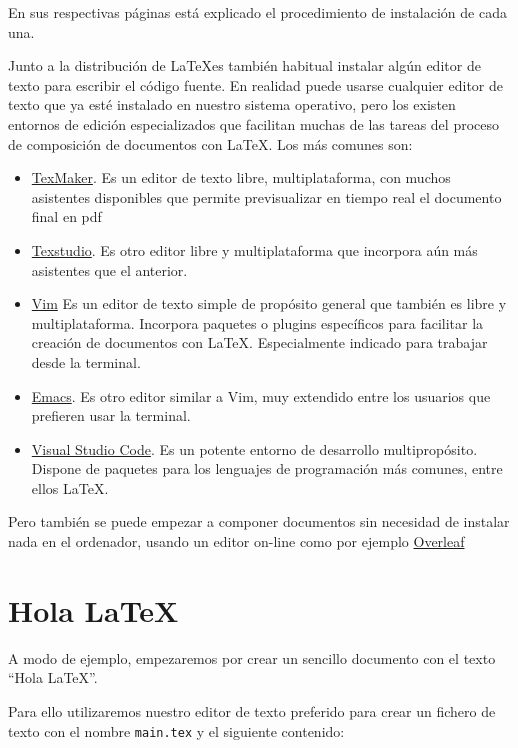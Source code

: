 \documentclass[
  letterpaper,
  DIV=11,
  numbers=noendperiod]{scrreport}
\providecommand{\tightlist}{%
  \setlength{\itemsep}{0pt}\setlength{\parskip}{0pt}}\usepackage{longtable,booktabs,array}
\begin{document}
En sus respectivas páginas está explicado el procedimiento de
instalación de cada una.

Junto a la distribución de \LaTeX es también habitual instalar algún
editor de texto para escribir el código fuente. En realidad puede usarse
cualquier editor de texto que ya esté instalado en nuestro sistema
operativo, pero los existen entornos de edición especializados que
facilitan muchas de las tareas del proceso de composición de documentos
con \LaTeX. Los más comunes son:

\begin{itemize}
\tightlist
\item
  \href{http://www.xm1math.net/texmaker/}{TexMaker}. Es un editor de
  texto libre, multiplataforma, con muchos asistentes disponibles que
  permite previsualizar en tiempo real el documento final en pdf
\item
  \href{http://www.texstudio.org/}{Texstudio}. Es otro editor libre y
  multiplataforma que incorpora aún más asistentes que el anterior.
\item
  \href{https://www.vim.org/}{Vim} Es un editor de texto simple de
  propósito general que también es libre y multiplataforma. Incorpora
  paquetes o plugins específicos para facilitar la creación de
  documentos con \LaTeX. Especialmente indicado para trabajar desde
  la terminal.
\item
  \href{https://www.gnu.org/software/emacs/}{Emacs}. Es otro editor
  similar a Vim, muy extendido entre los usuarios que prefieren usar la
  terminal.
\item
  \href{https://code.visualstudio.com/}{Visual Studio Code}. Es un
  potente entorno de desarrollo multipropósito. Dispone de paquetes para
  los lenguajes de programación más comunes, entre ellos \LaTeX.
\end{itemize}

Pero también se puede empezar a componer documentos sin necesidad de
instalar nada en el ordenador, usando un editor on-line como por ejemplo
\href{https://www.overleaf.com/}{Overleaf}

\hypertarget{hola-latex}{%
\section{Hola LaTeX}\label{hola-latex}}

A modo de ejemplo, empezaremos por crear un sencillo documento con el
texto ``Hola \LaTeX''.

Para ello utilizaremos nuestro editor de texto preferido para crear un
fichero de texto con el nombre \texttt{main.tex} y el siguiente
contenido:
\end{document}
